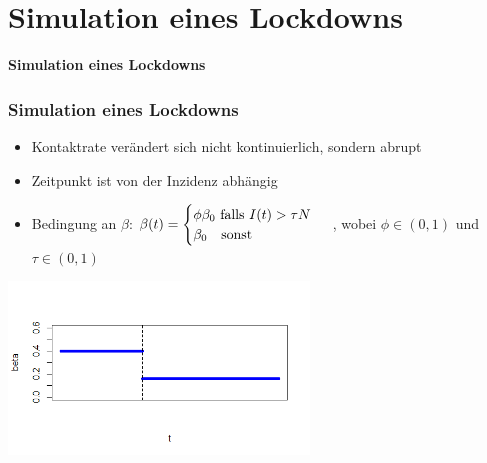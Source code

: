 \documentclass{beamer}
\begin{document}

\section{Simulation eines Lockdowns}

\begin{frame}
\centering
 \huge\textbf{Simulation eines Lockdowns}
\end{frame}

\begin{frame}
	\frametitle{Simulation eines Lockdowns}

\begin{itemize}
\item Kontaktrate verändert sich nicht kontinuierlich, sondern abrupt
\item Zeitpunkt ist von der Inzidenz abhängig
\item Bedingung an $\beta$: 
	$\beta(t) =  \begin{cases} 
					\phi \beta_0 \text{ falls } I(t) > \tau N \\
					\beta_0 \text{\quad sonst}
				\end{cases}$
	, wobei $\phi \in (0,1)$  und $\tau \in (0,1)$
\end{itemize}

\begin{center}
 \includegraphics[width = 0.6\textwidth]{stepfunction}
\end{center}


\end{frame}
\end{document}
